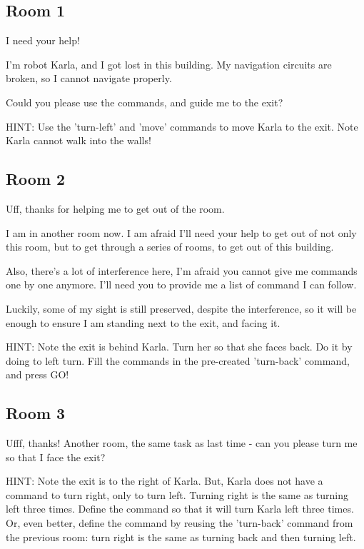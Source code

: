 \subsection{Room 1}

I need your help!

I'm robot Karla, and I got lost in this building. My navigation circuits are broken, so I cannot navigate properly.

Could you please use the commands, and guide me to the exit?

HINT: Use the 'turn-left' and 'move' commands to move Karla to the exit. Note Karla cannot walk into the walls!

\subsection{Room 2}

Uff, thanks for helping me to get out of the room.

I am in another room now. I am afraid I'll need your help to get out of not only this room, but to get through a series of rooms, to get out of this building.

Also, there's a lot of interference here, I'm afraid you cannot give me commands one by one anymore. I'll need you to provide me a list of command I can follow.

Luckily, some of my sight is still preserved, despite the interference, so it will be enough to ensure I am standing next to the exit, and facing it.

HINT: Note the exit is behind Karla. Turn her so that she faces back. Do it by doing to left turn. Fill the commands in the pre-created 'turn-back' command, and press GO!

\subsection{Room 3}

Ufff, thanks! Another room, the same task as last time - can you please turn me so that I face the exit?

HINT: Note the exit is to the right of Karla. But, Karla does not have a command to turn right, only to turn left. Turning right is the same as turning left three times. Define the command so that it will turn Karla left three times. Or, even better, define the command by reusing the 'turn-back' command from the previous room: turn right is the same as turning back and then turning left.


